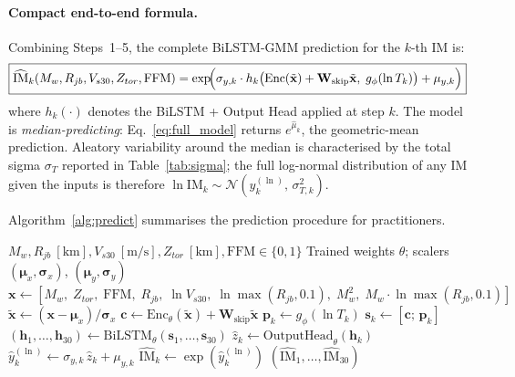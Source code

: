 \documentclass[12pt,a4paper]{article}
\begin{document}
\paragraph{Compact end-to-end formula.}
Combining Steps~1--5, the complete BiLSTM-GMM prediction for the $k$-th IM is:
\begin{equation}
  \boxed{
    \widehat{\mathrm{IM}}_k(M_w, R_{jb}, V_{s30}, Z_{tor}, \text{FFM})
    = \exp\!\Bigl(
        \sigma_{y,k}\cdot
        h_k\bigl(
          \mathrm{Enc}(\tilde{\mathbf{x}}) + \mathbf{W}_\text{skip}\tilde{\mathbf{x}},\;
          g_\phi(\ln T_k)
        \bigr)
        + \mu_{y,k}
      \Bigr)
  }
  \label{eq:full_model}
\end{equation}
where $h_k(\cdot)$ denotes the BiLSTM + Output Head applied at step $k$.
The model is \emph{median-predicting}: Eq.~\ref{eq:full_model} returns
$e^{\hat{\mu}_k}$, the geometric-mean prediction.
Aleatory variability around the median is characterised by the total sigma
$\sigma_T$ reported in Table~\ref{tab:sigma}; the full log-normal distribution
of any IM given the inputs is therefore $\ln\text{IM}_k \sim
\mathcal{N}(\hat{y}_k^{(\ln)},\,\sigma_{T,k}^2)$.

Algorithm~\ref{alg:predict} summarises the prediction procedure for practitioners.

\begin{algorithm}[htbp]
\caption{BiLSTM-GMM single-scenario prediction}
\label{alg:predict}
\begin{algorithmic}[1]
\Require $M_w, R_{jb}\ [\text{km}], V_{s30}\ [\text{m/s}], Z_{tor}\ [\text{km}],
         \text{FFM}\in\{0,1\}$
\Require Trained weights $\theta$; scalers $(\boldsymbol{\mu}_x,\boldsymbol{\sigma}_x)$,
         $(\boldsymbol{\mu}_y,\boldsymbol{\sigma}_y)$
\State $\mathbf{x} \leftarrow [M_w,\;Z_{tor},\;\text{FFM},\;R_{jb},\;\ln V_{s30},\;
        \ln\!\max(R_{jb},0.1),\;M_w^2,\;M_w\!\cdot\!\ln\!\max(R_{jb},0.1)]$
\State $\tilde{\mathbf{x}} \leftarrow (\mathbf{x}-\boldsymbol{\mu}_x)/\boldsymbol{\sigma}_x$
\State $\mathbf{c} \leftarrow \mathrm{Enc}_\theta(\tilde{\mathbf{x}}) +
        \mathbf{W}_\text{skip}\tilde{\mathbf{x}}$ 
  \State $\mathbf{p}_k \leftarrow g_\phi(\ln T_k)$ 
  \State $\mathbf{s}_k \leftarrow [\mathbf{c};\,\mathbf{p}_k]$ 
\EndFor
\State $(\mathbf{h}_1,\ldots,\mathbf{h}_{30}) \leftarrow
        \mathrm{BiLSTM}_\theta(\mathbf{s}_1,\ldots,\mathbf{s}_{30})$
  \State $\hat{z}_k \leftarrow \mathrm{OutputHead}_\theta(\mathbf{h}_k)$
  \State $\hat{y}_k^{(\ln)} \leftarrow \sigma_{y,k}\,\hat{z}_k + \mu_{y,k}$
  \State $\widehat{\mathrm{IM}}_k \leftarrow \exp(\hat{y}_k^{(\ln)})$
\EndFor
\State \Return $(\widehat{\mathrm{IM}}_1,\ldots,\widehat{\mathrm{IM}}_{30})$ 
\end{algorithmic}
\end{algorithm}
\end{document}
